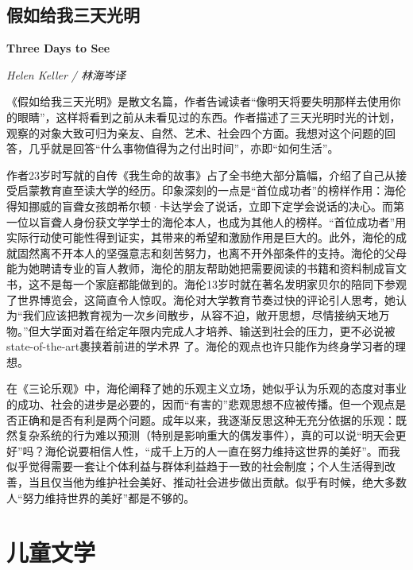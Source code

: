 \subsection*{假如给我三天光明}
\par \textbf{Three Days to See}
\par \emph{Helen Keller / 林海岑译} 
\par 《假如给我三天光明》是散文名篇，作者告诫读者“像明天将要失明那样去使用你的眼睛”，这样将看到之前从未看见过的东西。作者描述了三天光明时光的计划，观察的对象大致可归为亲友、自然、艺术、社会四个方面。我想对这个问题的回答，几乎就是回答“什么事物值得为之付出时间”，亦即“如何生活”。
\par 作者23岁时写就的自传《我生命的故事》占了全书绝大部分篇幅，介绍了自己从接受启蒙教育直至读大学的经历。印象深刻的一点是“首位成功者”的榜样作用：海伦得知挪威的盲聋女孩朗希尔顿·卡达学会了说话，立即下定学会说话的决心。而第一位以盲聋人身份获文学学士的海伦本人，也成为其他人的榜样。“首位成功者”用实际行动使可能性得到证实，其带来的希望和激励作用是巨大的。此外，海伦的成就固然离不开本人的坚强意志和刻苦努力，也离不开外部条件的支持。海伦的父母能为她聘请专业的盲人教师，海伦的朋友帮助她把需要阅读的书籍和资料制成盲文书，这不是每一个家庭都能做到的。海伦13岁时就在著名发明家贝尔的陪同下参观了世界博览会，这简直令人惊叹。海伦对大学教育节奏过快的评论引人思考，她认为“我们应该把教育视为一次乡间散步，从容不迫，敞开思想，尽情接纳天地万物。”但大学面对着在给定年限内完成人才培养、输送到社会的压力，更不必说被state-of-the-art裹挟着前进的学术界
了。海伦的观点也许只能作为终身学习者的理想。
\par 在《三论乐观》中，海伦阐释了她的乐观主义立场，她似乎认为乐观的态度对事业的成功、社会的进步是必要的，因而“有害的”悲观思想不应被传播。但一个观点是否正确和是否有利是两个问题。成年以来，我逐渐反思这种无充分依据的乐观：既然复杂系统的行为难以预测（特别是影响重大的偶发事件），真的可以说“明天会更好”吗？海伦说要相信人性，“成千上万的人一直在努力维持这世界的美好”。而我似乎觉得需要一套让个体利益与群体利益趋于一致的社会制度；个人生活得到改善，当且仅当他为维护社会美好、推动社会进步做出贡献。似乎有时候，绝大多数人“努力维持世界的美好”都是不够的。
\par {}

\section{儿童文学}

